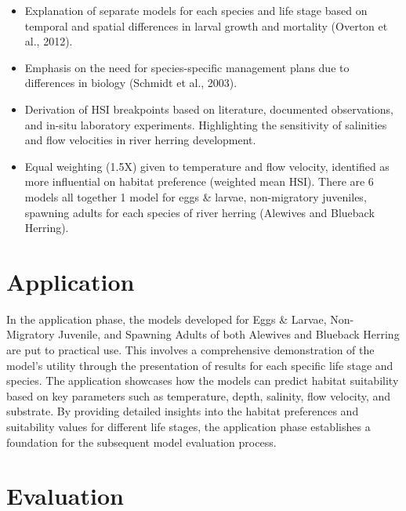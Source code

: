 \documentclass[
]{book}
\providecommand{\tightlist}{%
  \setlength{\itemsep}{0pt}\setlength{\parskip}{0pt}}
\begin{document}
\begin{itemize}
\tightlist
\item
  Explanation of separate models for each species and life stage based on temporal and spatial differences in larval growth and mortality (Overton et al., 2012).
\item
  Emphasis on the need for species-specific management plans due to differences in biology (Schmidt et al., 2003).
\item
  Derivation of HSI breakpoints based on literature, documented observations, and in-situ laboratory experiments. Highlighting the sensitivity of salinities and flow velocities in river herring development.
\item
  Equal weighting (1.5X) given to temperature and flow velocity, identified as more influential on habitat preference (weighted mean HSI).
  There are 6 models all together 1 model for eggs \& larvae, non-migratory juveniles, spawning adults for each species of river herring (Alewives and Blueback Herring).
\end{itemize}

\hypertarget{application}{%
\section{Application}\label{application}}

In the application phase, the models developed for Eggs \& Larvae, Non-Migratory Juvenile, and Spawning Adults of both Alewives and Blueback Herring are put to practical use. This involves a comprehensive demonstration of the model's utility through the presentation of results for each specific life stage and species. The application showcases how the models can predict habitat suitability based on key parameters such as temperature, depth, salinity, flow velocity, and substrate. By providing detailed insights into the habitat preferences and suitability values for different life stages, the application phase establishes a foundation for the subsequent model evaluation process.

\hypertarget{evaluation}{%
\section{Evaluation}\label{evaluation}}
\end{document}
